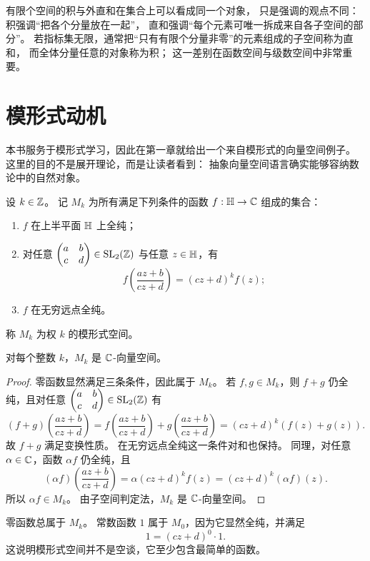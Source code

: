 \begin{remark} 有限个空间的积与外直和在集合上可以看成同一个对象，
只是强调的观点不同： 积强调“把各个分量放在一起”，
直和强调“每个元素可唯一拆成来自各子空间的部分”。 若指标集无限，通常把“只有有限个分量非零”的元素组成的子空间称为直和，
而全体分量任意的对象称为积； 这一差别在函数空间与级数空间中非常重要。
\end{remark}

\section{模形式动机}

本书服务于模形式学习，因此在第一章就给出一个来自模形式的向量空间例子。 这里的目的不是展开理论，而是让读者看到：
抽象向量空间语言确实能够容纳数论中的自然对象。

\begin{definition} 设 $k\in\mathbb{Z}$。
记 $M_k$ 为所有满足下列条件的函数 $f:\mathbb{H}\to\mathbb{C}$ 组成的集合： \begin{enumerate}[label=\textup{(\arabic*)}]
\item $f$ 在上半平面 $\mathbb{H}$ 上全纯； \item 对任意 $\begin{pmatrix} a&b\\c&d \end{pmatrix}\in\mathrm{SL}_2(\mathbb{Z})$ 与任意 $z\in\mathbb{H}$，有
\[ f\!\left(\frac{az+b}{cz+d}\right)=(cz+d)^k f(z);
\] \item $f$ 在无穷远点全纯。
\end{enumerate} 称 $M_k$ 为权 $k$ 的模形式空间。
\end{definition}

\begin{proposition} 对每个整数 $k$，$M_k$ 是 $\mathbb{C}$-向量空间。
\end{proposition}

\begin{proof} 零函数显然满足三条条件，因此属于 $M_k$。
若 $f,g\in M_k$，则 $f+g$ 仍全纯，且对任意 $\begin{pmatrix} a&b\\c&d \end{pmatrix}\in\mathrm{SL}_2(\mathbb{Z})$ 有
\[ (f+g)\!\left(\frac{az+b}{cz+d}\right)
=f\!\left(\frac{az+b}{cz+d}\right)+g\!\left(\frac{az+b}{cz+d}\right) =(cz+d)^k(f(z)+g(z)).
\] 故 $f+g$ 满足变换性质。
在无穷远点全纯这一条件对和也保持。 同理，对任意 $\alpha\in\mathbb{C}$，函数 $\alpha f$ 仍全纯，且
\[ (\alpha f)\!\left(\frac{az+b}{cz+d}\right)
=\alpha (cz+d)^k f(z) =(cz+d)^k (\alpha f)(z).
\] 所以 $\alpha f\in M_k$。
由子空间判定法，$M_k$ 是 $\mathbb{C}$-向量空间。 \end{proof}

\begin{example} 零函数总属于 $M_k$。
常数函数 $1$ 属于 $M_0$，因为它显然全纯，并满足 \[
1=(cz+d)^0\cdot 1. \]
这说明模形式空间并不是空谈，它至少包含最简单的函数。 \end{example}

